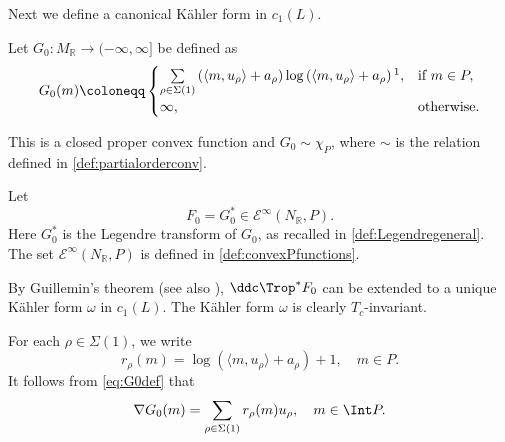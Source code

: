 Next we define a canonical K\"ahler form in $c_1(L)$.

Let $G_0\colon M_{\mathbb{R}}\rightarrow (-\infty,\infty]$ be defined as
\begin{equation}\label{eq:G0def}
G_0(m)\coloneqq
\begin{cases}
\sum\limits_{\rho \in \Sigma(1)} \left(\langle m, u_{\rho}\rangle +a_{\rho}\right)\log  \left(\langle m, u_{\rho}\rangle +a_{\rho}\right)\footnotemark,&\textup{if }m\in P,\\
\infty,& \textup{otherwise}.
\end{cases}
\end{equation}

This is a closed proper convex function and $G_0\sim \chi_P$, where $\sim$ is the relation defined in \cref{def:partialorderconv}.

Let
\begin{equation}\label{eq:F0def}
F_0=G_0^* \in \mathcal{E}^{\infty}(N_{\mathbb{R}},P).
\end{equation}
Here $G_0^*$ is the Legendre transform of $G_0$, as recalled in \cref{def:Legendregeneral}. The set $\mathcal{E}^{\infty}(N_{\mathbb{R}},P)$ is defined in \cref{def:convexPfunctions}.

By Guillemin's theorem \cite{Gui94, CDG03} (see also \cite[Theorem~18.9.1]{FPT}), $\ddc\Trop^* F_0$ can be extended to a unique K\"ahler form $\omega$ in $c_1(L)$. The K\"ahler form $\omega$ is clearly $T_c$-invariant.

For each $\rho\in \Sigma(1)$, we write
\[
    r_{\rho}(m)=\log \left(\langle m,u_{\rho}\rangle +a_{\rho}\right)+1,\quad m\in P.
\]
It follows from \eqref{eq:G0def} that
\begin{equation}\label{eq:nablaG0}
    \nabla G_0(m)=\sum_{\rho\in \Sigma(1)} r_{\rho}(m)u_{\rho},\quad m\in \Int P.
\end{equation}


